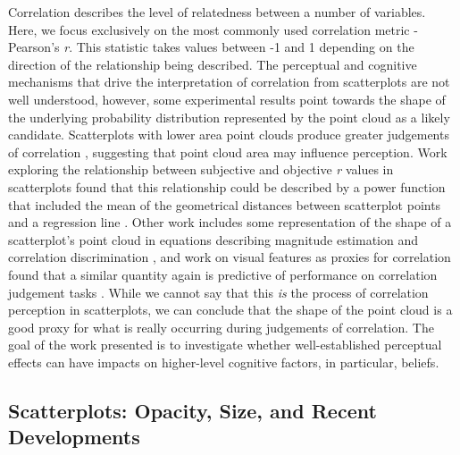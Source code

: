 \documentclass[sigconf]{acmart}
\begin{document}
Correlation describes the level of relatedness between a number of
variables. Here, we focus exclusively on the most commonly used
correlation metric - Pearson's \emph{r}. This statistic takes values
between -1 and 1 depending on the direction of the relationship being
described. The perceptual and cognitive mechanisms that drive the
interpretation of correlation from scatterplots are not well understood,
however, some experimental results point towards the shape of the
underlying probability distribution represented by the point cloud as a
likely candidate. Scatterplots with lower area point clouds produce
greater judgements of correlation \citep{cleveland_1982}, suggesting
that point cloud area may influence perception. Work exploring the
relationship between subjective and objective \emph{r} values in
scatterplots found that this relationship could be described by a power
function that included the mean of the geometrical distances between
scatterplot points and a regression line \citep{meyer_1997}. Other work
includes some representation of the shape of a scatterplot's point cloud
in equations describing magnitude estimation and correlation
discrimination \citep{meyer_1997, rensink_2017}, and work on visual
features as proxies for correlation found that a similar quantity again
is predictive of performance on correlation judgement tasks
\citep{yang_2019}. While we cannot say that this \emph{is} the process
of correlation perception in scatterplots, we can conclude that the
shape of the point cloud is a good proxy for what is really occurring
during judgements of correlation. The goal of the work presented is to
investigate whether well-established perceptual effects can have impacts
on higher-level cognitive factors, in particular, beliefs.

\subsection{Scatterplots: Opacity, Size, and Recent
Developments}\label{sec-scatterplots}
\end{document}
